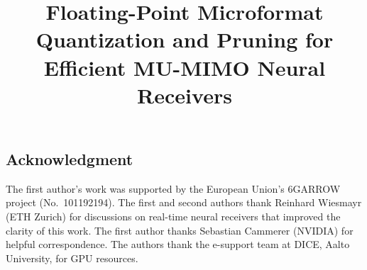 \documentclass{article}
\title{Floating-Point Microformat Quantization and Pruning for Efficient MU-MIMO Neural Receivers}
\begin{document}
\ninept
%
\maketitle
%









\clearpage
\subsection*{Acknowledgment}
The first author's work was supported by the European Union's 6GARROW project
(No.~101192194). The first and second authors thank Reinhard Wiesmayr
(ETH Zurich) for discussions on real-time neural receivers that improved
the clarity of this work. The first author thanks Sebastian Cammerer
(NVIDIA) for helpful correspondence. The authors thank the e-support team
at DICE, Aalto University, for GPU resources.



%
\end{document}
